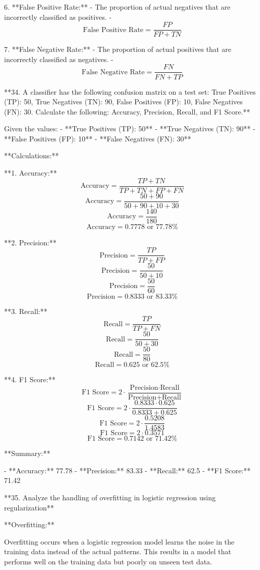 6. **False Positive Rate:**
   - The proportion of actual negatives that are incorrectly classified as positives.
   - \[ \text{False Positive Rate} = \frac{FP}{FP + TN} \]

7. **False Negative Rate:**
   - The proportion of actual positives that are incorrectly classified as negatives.
   - \[ \text{False Negative Rate} = \frac{FN}{FN + TP} \]



 **34. A classifier has the following confusion matrix on a test set: True Positives (TP): 50, True Negatives (TN): 90, False Positives (FP): 10, False Negatives (FN): 30. Calculate the following: Accuracy, Precision, Recall, and F1 Score.**

Given the values:
- **True Positives (TP): 50**
- **True Negatives (TN): 90**
- **False Positives (FP): 10**
- **False Negatives (FN): 30**

**Calculations:**

**1. Accuracy:**
\[ \text{Accuracy} = \frac{TP + TN}{TP + TN + FP + FN} \]
\[ \text{Accuracy} = \frac{50 + 90}{50 + 90 + 10 + 30} \]
\[ \text{Accuracy} = \frac{140}{180} \]
\[ \text{Accuracy} = 0.7778 \text{ or } 77.78\% \]

**2. Precision:**
\[ \text{Precision} = \frac{TP}{TP + FP} \]
\[ \text{Precision} = \frac{50}{50 + 10} \]
\[ \text{Precision} = \frac{50}{60} \]
\[ \text{Precision} = 0.8333 \text{ or } 83.33\% \]

**3. Recall:**
\[ \text{Recall} = \frac{TP}{TP + FN} \]
\[ \text{Recall} = \frac{50}{50 + 30} \]
\[ \text{Recall} = \frac{50}{80} \]
\[ \text{Recall} = 0.625 \text{ or } 62.5\% \]

**4. F1 Score:**
\[ \text{F1 Score} = 2 \cdot \frac{\text{Precision} \cdot \text{Recall}}{\text{Precision} + \text{Recall}} \]
\[ \text{F1 Score} = 2 \cdot \frac{0.8333 \cdot 0.625}{0.8333 + 0.625} \]
\[ \text{F1 Score} = 2 \cdot \frac{0.5208}{1.4583} \]
\[ \text{F1 Score} = 2 \cdot 0.3571 \]
\[ \text{F1 Score} = 0.7142 \text{ or } 71.42\% \]

**Summary:**

- **Accuracy:** 77.78%
- **Precision:** 83.33%
- **Recall:** 62.5%
- **F1 Score:** 71.42%

 **35. Analyze the handling of overfitting in logistic regression using regularization**

**Overfitting:**

Overfitting occurs when a logistic regression model learns the noise in the training data instead of the actual patterns. This results in a model that performs well on the training data but poorly on unseen test data.

